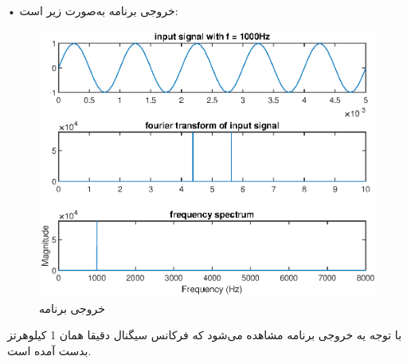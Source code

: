 \documentclass[12pt]{exam}
\begin{document}
\begin{questions}
• خروجی برنامه به‌صورت زیر است: 
\begin{figure}[t]
	\centering
	\includegraphics[width=1\textwidth]{images/Result}
	\caption{خروجی برنامه}
\end{figure}

با توجه یه خروجی برنامه مشاهده می‌شود که فرکانس سیگنال دقیقا همان 1 کیلوهرتز بدست آمده است.


\end{questions}
\end{document}
